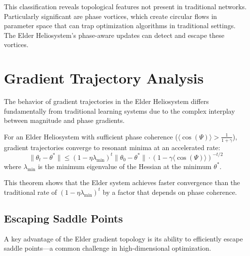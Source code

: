 This classification reveals topological features not present in traditional networks. Particularly significant are phase vortices, which create circular flows in parameter space that can trap optimization algorithms in traditional settings. The Elder Heliosystem's phase-aware updates can detect and escape these vortices.

\section{Gradient Trajectory Analysis}

The behavior of gradient trajectories in the Elder Heliosystem differs fundamentally from traditional learning systems due to the complex interplay between magnitude and phase gradients.

\begin{theorem}
For an Elder Heliosystem with sufficient phase coherence ($\langle\cos(\Psi)\rangle > \frac{1}{1+\gamma}$), gradient trajectories converge to resonant minima at an accelerated rate:
\begin{equation}
\|\theta_t - \theta^*\| \leq (1 - \eta \lambda_{\min})^t \|\theta_0 - \theta^*\| \cdot (1 - \gamma \langle\cos(\Psi)\rangle)^{-t/2}
\end{equation}
where $\lambda_{\min}$ is the minimum eigenvalue of the Hessian at the minimum $\theta^*$.
\end{theorem}

This theorem shows that the Elder system achieves faster convergence than the traditional rate of $(1 - \eta \lambda_{\min})^t$ by a factor that depends on phase coherence.

\subsection{Escaping Saddle Points}

A key advantage of the Elder gradient topology is its ability to efficiently escape saddle points—a common challenge in high-dimensional optimization.

